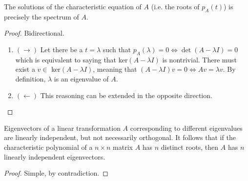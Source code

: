   \begin{theorem}
    The solutions of the characteristic equation of $A$ (i.e. the roots of $p_A (t)$) is precisely the spectrum of $A$. 
  \end{theorem}
  \begin{proof} 
    Bidirectional. 
    \begin{enumerate}
      \item $(\rightarrow)$ Let there be a $t = \lambda$ such that $p_A (\lambda) = 0 \iff \det{(A - \lambda I)} = 0$ which is equivalent to saying that ker$(A - \lambda I)$ is nontrivial. There must exist a $v \in $ ker$(A - \lambda I)$, meaning that $(A - \lambda I) v = 0 \iff A v = \lambda v$. By definition, $\lambda$ is an eigenvalue of $A$. 
      \item $(\leftarrow)$ This reasoning can be extended in the opposite direction. 
    \end{enumerate}
  \end{proof}

  \begin{theorem}
    Eigenvectors of a linear transformation $A$ corresponding to different eigenvalues are linearly independent, but not necessarily orthogonal. It follows that if the characteristic polynomial of a $n \times n$ matrix $A$ has $n$ distinct roots, then $A$ has $n$ linearly independent eigenvectors. 
  \end{theorem}
  \begin{proof}
    Simple, by contradiction.
  \end{proof}

